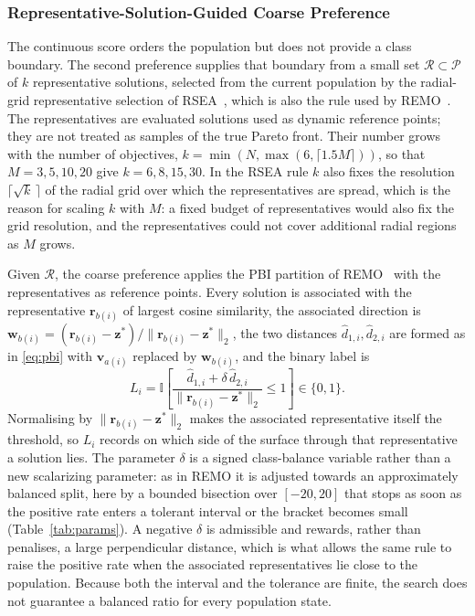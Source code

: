 \documentclass[final,5p,times,twocolumn]{elsarticle}
\newcommand{\vv}{\mathbf{v}}
\newcommand{\vw}{\mathbf{w}}
\newcommand{\vr}{\mathbf{r}}
\newcommand{\vz}{\mathbf{z}}
\begin{document}
\subsubsection{Representative-Solution-Guided Coarse Preference}
\label{sec:method:hpc:coarse}

The continuous score orders the population but does not provide a class
boundary. The second preference supplies that boundary from a small set
$\mathcal{R}\subset\mathcal{P}$ of $k$ representative solutions, selected from
the current population by the radial-grid representative selection of
RSEA~\cite{ref:rsea}, which is also the rule used by REMO~\cite{ref:remo}. The
representatives are evaluated solutions used as dynamic reference points; they
are not treated as samples of the true Pareto front. Their number grows with
the number of objectives, $k=\min(N,\max(6,\lceil1.5M\rceil))$, so that
$M=3,5,10,20$ give $k=6,8,15,30$. In the RSEA rule $k$ also fixes the
resolution $\lceil\sqrt{k}\,\rceil$ of the radial grid over which the
representatives are spread, which is the reason for scaling $k$ with $M$: a
fixed budget of representatives would also fix the grid resolution, and the
representatives could not cover additional radial regions as $M$ grows.

Given $\mathcal{R}$, the coarse preference applies the PBI partition of
REMO~\cite{ref:remo} with the representatives as reference points. Every
solution is associated with the representative $\vr_{b(i)}$ of largest cosine
similarity, the associated direction is
$\vw_{b(i)}=(\vr_{b(i)}-\vz^{*})/\|\vr_{b(i)}-\vz^{*}\|_2$, the two distances
$\hat d_{1,i},\hat d_{2,i}$ are formed as in \eqref{eq:pbi} with
$\vv_{a(i)}$ replaced by $\vw_{b(i)}$, and the binary label is
\begin{equation}
L_i=\mathbb{I}\!\left[
\frac{\hat d_{1,i}+\delta\,\hat d_{2,i}}
     {\|\vr_{b(i)}-\vz^{*}\|_2}\leq1\right]\in\{0,1\}.
\label{eq:label-bin}
\end{equation}
Normalising by $\|\vr_{b(i)}-\vz^{*}\|_2$ makes the associated representative
itself the threshold, so $L_i$ records on which side of the surface through that
representative a solution lies. The parameter $\delta$ is a signed class-balance
variable rather than a new scalarizing parameter: as in REMO it is adjusted
towards an approximately balanced split, here by a bounded bisection over
$[-20,20]$ that stops as soon as the positive rate enters a tolerant interval or
the bracket becomes small (Table~\ref{tab:params}). A negative $\delta$ is
admissible and rewards, rather than penalises, a large perpendicular distance,
which is what allows the same rule to raise the positive rate when the
associated representatives lie close to the population. Because both the
interval and the tolerance are finite, the search does not guarantee a balanced
ratio for every population state.
\end{document}
